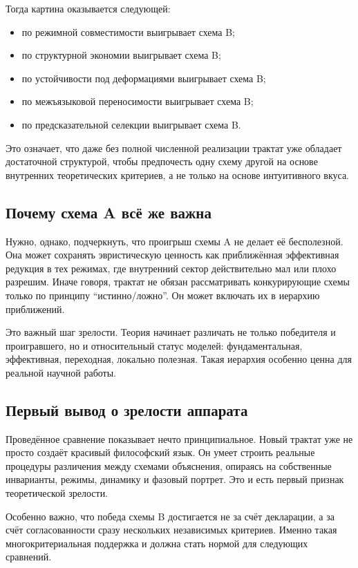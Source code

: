 \documentclass[12pt,a4paper]{article}
\begin{document}
Тогда картина оказывается следующей:
\begin{itemize}
    \item по режимной совместимости выигрывает схема B;
    \item по структурной экономии выигрывает схема B;
    \item по устойчивости под деформациями выигрывает схема B;
    \item по межъязыковой переносимости выигрывает схема B;
    \item по предсказательной селекции выигрывает схема B.
\end{itemize}

Это означает, что даже без полной численной реализации трактат уже обладает достаточной структурой, чтобы предпочесть одну схему другой на основе внутренних теоретических критериев, а не только на основе интуитивного вкуса.

\subsection{Почему схема A всё же важна}

Нужно, однако, подчеркнуть, что проигрыш схемы A не делает её бесполезной. Она может сохранять эвристическую ценность как приближённая эффективная редукция в тех режимах, где внутренний сектор действительно мал или плохо разрешим. Иначе говоря, трактат не обязан рассматривать конкурирующие схемы только по принципу ``истинно/ложно''. Он может включать их в иерархию приближений.

Это важный шаг зрелости. Теория начинает различать не только победителя и проигравшего, но и относительный статус моделей: фундаментальная, эффективная, переходная, локально полезная. Такая иерархия особенно ценна для реальной научной работы.

\subsection{Первый вывод о зрелости аппарата}

Проведённое сравнение показывает нечто принципиальное. Новый трактат уже не просто создаёт красивый философский язык. Он умеет строить реальные процедуры различения между схемами объяснения, опираясь на собственные инварианты, режимы, динамику и фазовый портрет. Это и есть первый признак теоретической зрелости.

Особенно важно, что победа схемы B достигается не за счёт декларации, а за счёт согласованности сразу нескольких независимых критериев. Именно такая многокритериальная поддержка и должна стать нормой для следующих сравнений.
\end{document}
